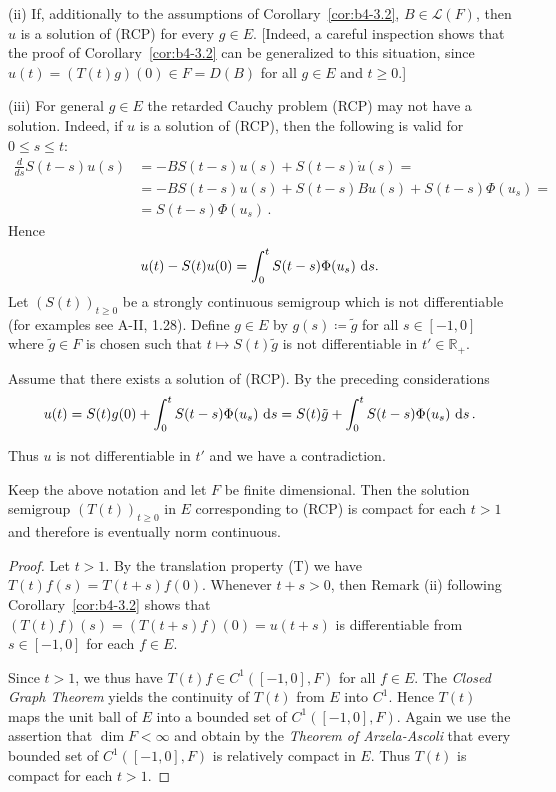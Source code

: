 (ii) If, additionally to the assumptions of Corollary~\ref{cor:b4-3.2}, $B \in \mathcal{L}(F)$, then $u$ is a solution of (RCP) for every $g \in E$. 
[Indeed, a careful inspection shows that the proof of Corollary~\ref{cor:b4-3.2} can be generalized to this situation, since $u(t) = (T(t)g)(0) \in F = D(B)$ for all $g \in E$ and $t \geq 0$.]

(iii) For general $g \in E$ the retarded Cauchy problem (RCP) may not have a solution. 
Indeed, if $u$ is a solution of (RCP), then the following is valid for $0 \leq s \leq t$:
\begin{equation*}
	\begin{aligned}
\frac{d}{ds}S(t-s)u(s) &= -BS(t-s)u(s) + S(t-s)\dot{u}(s) =\\
& = -BS(t-s)u(s) + S(t-s)Bu(s) + S(t-s)\Phi(u_s) = \\ & =S(t-s)\Phi(u_s)\,.
\end{aligned}
\end{equation*} 
Hence
\[
u(t) - S(t)u(0) = \int_0^t S(t-s)\Phi(u_s) \,\mathop{}\!\mathrm{d}{s}.
\]
Let $(S(t))_{t \geq 0}$ be a strongly continuous semigroup which is not differentiable (for examples see A-II,  1.28). 
Define $g \in E$ by $g(s)  \coloneq  \tilde{g}$ for all $s \in [-1,0]$ where $\tilde{g} \in F$ is chosen such that
%
%
$t \mapsto S(t)\tilde{g}$ is not differentiable in $t' \in \mathbb{R}_+$.

Assume that there exists a solution of (RCP). 
By the preceding considerations
\[
u(t) = S(t)g(0) + \int_0^t S(t-s)\Phi(u_s) \,\mathop{}\!\mathrm{d}{s} = S(t)\tilde{g} + \int_0^t S(t-s)\Phi(u_s) \,\mathop{}\!\mathrm{d}{s}\,.
\]

Thus $u$ is not differentiable in $t'$ and we have a contradiction.
\begin{corollary}\label{cor:b4-3.3}
	Keep the above notation and let $F$ be finite dimensional. 
    Then the solution semigroup $(T(t))_{t \geq 0}$ in $E$ corresponding to (RCP) is compact for each $t > 1$ and therefore is eventually norm continuous.
\end{corollary}

\begin{proof} 
Let $t > 1$. 
By the translation property (T) we have $T(t)f(s) = T(t+s)f(0)$. Whenever $t + s > 0$, then Remark (ii) following Corollary~\ref{cor:b4-3.2} shows that $(T(t)f)(s) = (T(t+s)f)(0) = u(t+s)$ is differentiable from $s \in [-1,0]$ for each $f \in E$.

Since $t > 1$, we thus have $T(t)f \in C^1([-1,0],F)$ for all $f \in E$. 
The \emph{Closed Graph Theorem} yields the continuity of $T(t)$ from $E$ into $C^1$. 
Hence $T(t)$ maps the unit ball of $E$ into a bounded set of $C^1([-1,0],F)$. 
Again we use the assertion that $\dim F < \infty$ and obtain by the \emph{Theorem of Arzela-Ascoli} that every bounded set of $C^1([-1,0],F)$ is relatively compact in $E$. 
Thus $T(t)$ is compact for each $t > 1$.
\end{proof}

